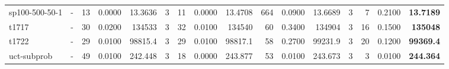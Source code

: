 \documentclass[a4paper]{article}
\begin{document}
\begin{sidewaystable}[h]
\begin{tabular}{l|r|r|r|r|r|r|r|r|r|r|r|r|r|r|r}
sp100-500-50-1 & \multicolumn{1}{c|}{ - } & 13 & 0.0000 & 13.3636 & 3 & 11 & 0.0000 & 13.4708 & 664 & 0.0900 & 13.6689 & 3 & 7 & 0.2100 & \textbf{13.7189} \\
t1717 & \multicolumn{1}{c|}{ - } & 30 & 0.0200 & 134533 & 3 & 32 & 0.0100 & 134540 & 60 & 0.3400 & 134904 & 3 & 16 & 0.1500 & \textbf{135048} \\
t1722 & \multicolumn{1}{c|}{ - } & 29 & 0.0100 & 98815.4 & 3 & 29 & 0.0100 & 98817.1 & 58 & 0.2700 & 99231.9 & 3 & 20 & 0.1200 & \textbf{99369.4} \\
uct-subprob & \multicolumn{1}{c|}{ - } & 49 & 0.0100 & 242.448 & 3 & 18 & 0.0000 & 243.877 & 53 & 0.0100 & 243.673 & 3 & 3 & 0.0100 & \textbf{244.364} \\
\hline
\end{tabular} 
\end{sidewaystable}
\end{document}
